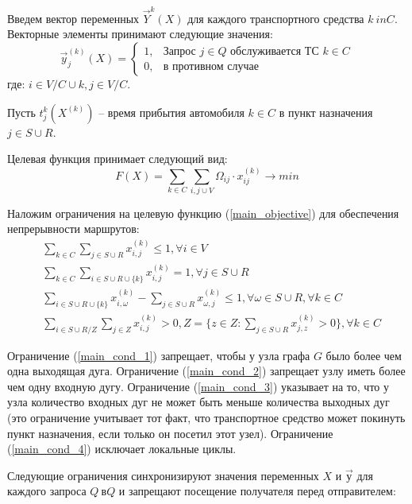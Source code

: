 \documentclass[]{TAACpaper}
\begin{document}
Введем вектор переменных $ \vec{Y}  ^ k(X) $ для каждого транспортного средства  $ k \ in C $. Векторные элементы принимают следующие значения:
\begin{equation}
\vec{y}^{(k)}_{j}(X) = 
\begin{cases}
1,&\text{Запрос $j \in Q$ обслуживается ТС $k \in C$}\\
0,&\text{в противном случае}
\end{cases}
\end{equation}
где: $i\in{V/C \cup {k}}, j \in V/C$.


Пусть $t^k_j(X^{(k)})$ -- время прибытия автомобиля $k \in C$ в пункт назначения $j \in S \cup R$. 

Целевая функция принимает следующий вид:
\begin{equation} \label{main_objective}
  F(X) = 
    \sum_{k \in C}
     \sum_{i,j\cup{V}} 
     \Omega_{ij} \cdot x_{ij}^{(k)} 
     \to min
\end{equation}

Наложим ограничения на целевую функцию  (\ref{main_objective}) для обеспечения непрерывности маршрутов:
\begin{align} 
& \sum_{k \in C}\sum_{j \in S \cup R}x^{(k)}_{i,j} \leq 1, 
\forall i \in V \label{main_cond_1}\\
& \sum_{k \in C}\sum_{i \in S \cup R \cup \{k\} } x^{(k)}_{i,j} = 1, 
\forall j \in S \cup R \label{main_cond_2}\\
& \sum_{i \in S \cup R \cup \{k\} } x^{(k)}_{i,\omega} - 
\sum_{j \in S \cup R} x^{(k)}_{\omega,j} \leq 1, 
\forall \omega \in S \cup R,  \forall k \in C \label{main_cond_3}\\
&  \sum_{i \in S \cup R / Z}\sum_{j \in Z } x^{(k)}_{i,j} > 0, 
Z=\{z \in Z: \sum_{j \in S \cup R}x^{(k)}_{j,z}>0 \}  ,\forall k \in C \label{main_cond_4}
\end{align}

Ограничение (\ref{main_cond_1}) запрещает, чтобы у узла графа $G$ было более чем одна выходящая дуга. Ограничение (\ref {main_cond_2}) запрещает узлу иметь более чем одну входную дугу. Ограничение (\ref {main_cond_3}) указывает на то, что у узла количество входных дуг не может быть меньше количества выходных дуг (это ограничение учитывает тот факт, что транспортное средство может покинуть пункт назначения, если только он посетил этот узел). Ограничение (\ref {main_cond_4}) исключает локальные циклы.

Следующие ограничения синхронизируют значения переменных $X$ и $ \Vec{у} $ для каждого запроса $ Q \ в Q $ и запрещают посещение получателя перед отправителем:
\end{document}
